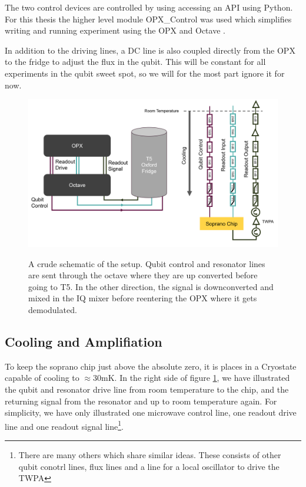 The two control devices are controlled by using accessing an API using Python. For this thesis the higher level module OPX\_Control was used which simplifies writing and running experiment using the OPX and Octave \cite{hastrup_cqed_nodate}. 

In addition to the driving lines, a DC line is also coupled directly from the OPX to the fridge to adjust the flux in the qubit. This will be constant for all experiments in the qubit sweet spot, so we will for the most part ignore it for now. 


\begin{figure}[t]
    \caption{A crude schematic of the setup. Qubit control and resonator lines are sent through the octave where they are up converted before going to T5. In the other direction, the signal is downconverted and mixed in the IQ mixer before reentering the OPX where it gets demodulated.}
    \includegraphics[]{Figs/hardware/fridge_and_control.png}
    \label{fig:Fridge_control_hardware_setup}
\end{figure}


\subsection{Cooling and Amplifiation}
To keep the soprano chip just above the absolute zero, it is places in a Cryostate capable of cooling to $\approx 30 \text{mK}$. In the right side of  figure \ref{fig:Fridge_control_hardware_setup}, we have illustrated the qubit and resonator drive line from room temperature to the chip, and the returning signal from the resonator and up to room temperature again. For simplicity, we have only illustrated one microwave control line, one readout drive line and one readout signal line\footnote{There are many others which share similar ideas. These consists of other qubit conotrl lines, flux lines and a line for a local oscillator to drive the TWPA}.

